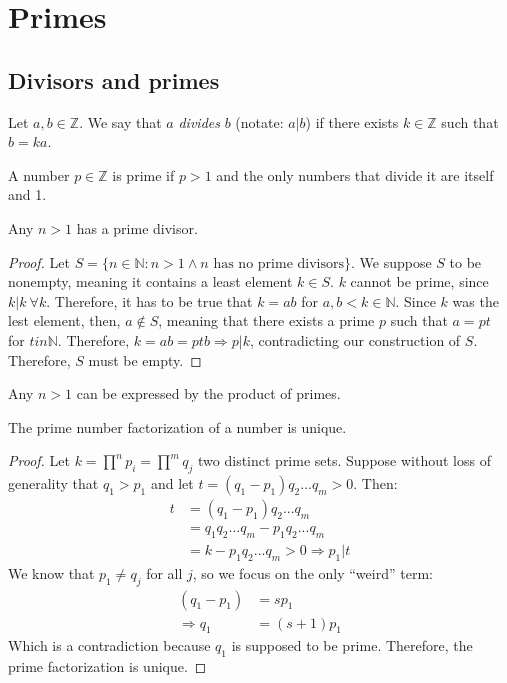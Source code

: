 \chapter{Primes}

\section{Divisors and primes}

\begin{definition}
  Let $a, b \in \mathbb{Z}$. We say that $a$ \emph{divides} $b$ (notate: $a|b$) if there exists $k \in \mathbb{Z}$ such that $b = ka$.
\end{definition}
\begin{definition}
  A number $p \in \mathbb{Z}$ is prime if $p > 1$ and the only numbers that divide it are itself and 1.
\end{definition}

\begin{theorem}
  Any $n > 1$ has a prime divisor.
\end{theorem}
\begin{proof}
  Let $S = \{n \in \mathbb{N}: n > 1 \land n\text{ has no prime divisors}\}$. We suppose $S$ to be nonempty, meaning it contains a least element $k \in S$. $k$ cannot be prime, since $k|k \ \forall k$. Therefore, it has to be true that $k = ab$ for $a, b < k \in \mathbb{N}$. Since $k$ was the lest element, then, $a \notin S$, meaning that there exists a prime $p$ such that $a = pt$ for $t in \mathbb{N}$. Therefore, $k = ab = ptb \Rightarrow p|k$, contradicting our construction of $S$. Therefore, $S$ must be empty.
\end{proof}
\begin{theorem}\label{primefact}
  Any $n > 1$ can be expressed by the product of primes.
\end{theorem}
\begin{theorem}
  The prime number factorization of a number is unique.
\end{theorem}
\begin{proof}
  Let $k = \prod^n p_i = \prod^m q_j$ two distinct prime sets. Suppose without loss of generality that $q_1 > p_1$ and let $t = (q_1 - p_1)q_2...q_m > 0$. Then: 
  \begin{align*}
    t 
    &= (q_1 - p_1)q_2...q_m \\
    &= q_1q_2...q_m - p_1q_2...q_m \\
    &= k - p_1q_2...q_m > 0 \Rightarrow p_1|t
  \end{align*}
  We know that $p_1 \neq q_j$ for all $j$, so we focus on the only ``weird'' term: 
  \begin{align*}
    (q_1 - p_1) &= sp_1 \\
    \Rightarrow q_1 &= (s + 1)p_1
  \end{align*}
  Which is a contradiction because $q_1$ is supposed to be prime. Therefore, the prime factorization is unique. 
\end{proof}

